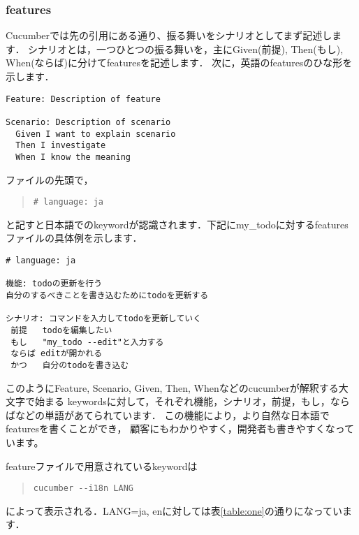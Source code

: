 \subsubsection{features}
Cucumberでは先の引用にある通り、振る舞いをシナリオとしてまず記述します．
シナリオとは，一つひとつの振る舞いを，主にGiven(前提), Then(もし), When(ならば)に分けてfeaturesを記述します．
次に，英語のfeaturesのひな形を示します．
\begin{lstlisting}[style=customRuby,basicstyle={\scriptsize\ttfamily}]
% cat ./featrues/sample_e.feature
Feature: Description of feature

Scenario: Description of scenario
  Given I want to explain scenario
  Then I investigate
  When I know the meaning
\end{lstlisting}
ファイルの先頭で，
\begin{quote}\begin{verbatim}
# language: ja
\end{verbatim}\end{quote}
と記すと日本語でのkeywordが認識されます．下記にmy\_todoに対するfeaturesファイルの具体例を示します．
\begin{lstlisting}[style=customCsh,basicstyle={\scriptsize\ttfamily}]
# language: ja

機能: todoの更新を行う
自分のするべきことを書き込むためにtodoを更新する

シナリオ: コマンドを入力してtodoを更新していく
 前提   todoを編集したい
 もし   "my_todo --edit"と入力する
 ならば editが開かれる
 かつ   自分のtodoを書き込む
\end{lstlisting}
このようにFeature, Scenario, Given, Then, Whenなどのcucumberが解釈する大文字で始まる
keywordsに対して，それぞれ機能，シナリオ，前提，もし，ならばなどの単語があてられています．
この機能により，より自然な日本語でfeaturesを書くことができ，
顧客にもわかりやすく，開発者も書きやすくなっています。

featureファイルで用意されているkeywordは
\begin{quote}\begin{verbatim}
cucumber --i18n LANG
\end{verbatim}\end{quote}
によって表示される．LANG=ja, enに対しては表\ref{table:one}の通りになっています．


